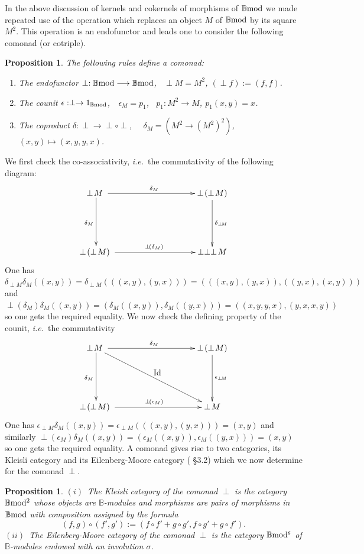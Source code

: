\documentclass[12pt]{article}
\newtheorem{prop}[thm]{Proposition}
\def\id{{\rm id}}
\def\B{{\mathbb B}}
\newcommand{\ie}{{\it i.e.\/}\ }
\def\id{{\mbox{Id}}}
\def\bmod{{\rm \B mod}}
\def\bm2{{\rm \B mod^2}}
\def\b2{{\rm \B mod^{\mathfrak s}}}
\begin{document}
In the above discussion of kernels and cokernels of morphisms of $\bmod$ we made repeated use of the operation which replaces an object $M$ of $\bmod$ by its square $M^2$. This operation is an endofunctor and leads one to consider the following comonad (or cotriple).
\begin{prop}\label{comonad} The following rules define a comonad:
\begin{enumerate}
	\item The endofunctor $\perp:\bmod\longrightarrow \bmod$,~ $\perp\! M=M^2$, $(\perp\!f):=(f,f)$.
	\item The counit $\epsilon: \perp \to 1_{\bmod}$,~~$\epsilon_M = p_1$,~ $p_1:M^2 \to M$, $p_1(x,y)=x$.
	\item The coproduct $\delta:\perp \to \perp\circ\perp$,~~ $\delta_M= (M^2 \to (M^2)^2)$, ~$(x,y)\mapsto (x,y,y,x)$. \end{enumerate}	
\end{prop}
\proof  We first check the co-associativity, \ie the commutativity of the following diagram:
 $$
\xymatrix@C=45pt@R=55pt{
\perp\! M \ \ar[d]_{\delta_M}\ar[rr]^{\delta_M} && \perp\!(\perp\! M)\ar[d]^{\delta_{\perp\!M}}
\\
\perp\!(\perp\! M) \ \ar[rr]^{\perp\!(\delta_M)}&&\perp \perp\perp\! M}
$$
One has $\delta_{\perp\!M}\delta_M((x,y))=\delta_{\perp\!M}(((x,y),(y,x)))=(((x,y),(y,x)),((y,x),(x,y)))$ and \newline
$\perp\!(\delta_M)\delta_M((x,y))=(\delta_M((x,y)),\delta_M((y,x)))=((x,y,y,x),(y,x,x,y))$ so one gets the required equality. We now check the defining property of the counit, \ie the commutativity
$$
\xymatrix@C=45pt@R=55pt{
\perp\! M \ \ar[d]_{\delta_M}\ar[rr]^{\delta_M}\ar[drr]^\id && \perp\!(\perp\! M)\ar[d]^{\epsilon_{\perp\!M}}
\\
\perp\!(\perp\! M) \ \ar[rr]^{\perp\!(\epsilon_M)}&&\perp\! M}
$$
One has $\epsilon_{\perp\!M}\delta_M((x,y))=\epsilon_{\perp\!M}(((x,y),(y,x)))=(x,y)$ and similarly $\perp\!(\epsilon_M)\delta_M((x,y))=(\epsilon_M((x,y)),\epsilon_M((y,x)))=(x,y)$ so one gets the required equality.
\endproof 
A comonad gives rise to two categories, its Kleisli category and its Eilenberg-Moore category (\!\cite{barr} \S 3.2) which we now determine for the comonad $\perp$.
\begin{prop}\label{Kleisli} 
$(i)$~The Kleisli category of the comonad $\perp$ is the category $\bm2$ whose objects are  $\B$-modules and morphisms are pairs of morphisms in $\bmod$ with composition assigned by the formula
\begin{equation}\label{paircompbm2}
	(f,g)\circ (f',g'):=(f\circ f'+g\circ g', f\circ g'+g\circ f').
\end{equation}
$(ii)$~The Eilenberg-Moore category of the comonad $\perp$ is the category $\b2$ of $\B$-modules endowed with an involution $\sigma$.
\end{prop} 
\end{document}
